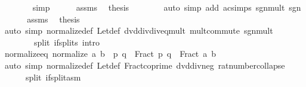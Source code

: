 \begin{isabellebody}
\ \ \ \ \ \ \isamarkupfalse%
\ simp\isanewline
\ \ \ \ \isamarkupfalse%
\ assms\ \isamarkupfalse%
\ {\isacharquery}{\kern0pt}thesis\isanewline
\ \ \ \ \ \ \isamarkupfalse%
\ {\isacharparenleft}{\kern0pt}auto\ simp\ add{\isacharcolon}{\kern0pt}\ ac{\isacharunderscore}{\kern0pt}simps\ sgn{\isacharunderscore}{\kern0pt}mult\ sgn{\isacharunderscore}{\kern0pt}{}{\isacharunderscore}{\kern0pt}{}{\isacharparenright}{\kern0pt}\isanewline
\ \ \isamarkupfalse%
\isanewline
\ \ \isamarkupfalse%
\ assms\ \isamarkupfalse%
\ {\isacharquery}{\kern0pt}thesis\isanewline
\ \ \ \ \isamarkupfalse%
\ {\isacharparenleft}{\kern0pt}auto\ simp{\isacharcolon}{\kern0pt}\ normalize{\isacharunderscore}{\kern0pt}def\ Let{\isacharunderscore}{\kern0pt}def\ dvd{\isacharunderscore}{\kern0pt}div{\isacharunderscore}{\kern0pt}div{\isacharunderscore}{\kern0pt}eq{\isacharunderscore}{\kern0pt}mult\ mult{\isachardot}{\kern0pt}commute\ sgn{\isacharunderscore}{\kern0pt}mult\isanewline
\ \ \ \ \ \ \ \ split{\isacharcolon}{\kern0pt}\ if{\isacharunderscore}{\kern0pt}splits\ intro{\isacharcolon}{\kern0pt}\ {\isacharasterisk}{\kern0pt}{\isacharparenright}{\kern0pt}\isanewline
{}\isamarkupfalse%
%
\endisatagproof
{\isafoldproof}%
%
\isadelimproof
\isanewline
%
\endisadelimproof
\isanewline
{}\isamarkupfalse%
\ normalize{\isacharunderscore}{\kern0pt}eq{\isacharcolon}{\kern0pt}\ {\isachardoublequoteopen}normalize\ {\isacharparenleft}{\kern0pt}a{\isacharcomma}{\kern0pt}\ b{\isacharparenright}{\kern0pt}\ {\isacharequal}{\kern0pt}\ {\isacharparenleft}{\kern0pt}p{\isacharcomma}{\kern0pt}\ q{\isacharparenright}{\kern0pt}\ {\isasymLongrightarrow}\ Fract\ p\ q\ {\isacharequal}{\kern0pt}\ Fract\ a\ b{\isachardoublequoteclose}\isanewline
%
\isadelimproof
\ \ %
\endisadelimproof
%
\isatagproof
{}\isamarkupfalse%
\ {\isacharparenleft}{\kern0pt}auto\ simp{\isacharcolon}{\kern0pt}\ normalize{\isacharunderscore}{\kern0pt}def\ Let{\isacharunderscore}{\kern0pt}def\ Fract{\isacharunderscore}{\kern0pt}coprime\ dvd{\isacharunderscore}{\kern0pt}div{\isacharunderscore}{\kern0pt}neg\ rat{\isacharunderscore}{\kern0pt}number{\isacharunderscore}{\kern0pt}collapse\isanewline
\ \ \ \ \ \ split{\isacharcolon}{\kern0pt}\ if{\isacharunderscore}{\kern0pt}split{\isacharunderscore}{\kern0pt}asm{\isacharparenright}{\kern0pt}%
\endisatagproof
{\isafoldproof}%
%
\isadelimproof
\isanewline
%
\endisadelimproof
\isanewline
{}\isamarkupfalse%

\end{isabellebody}
